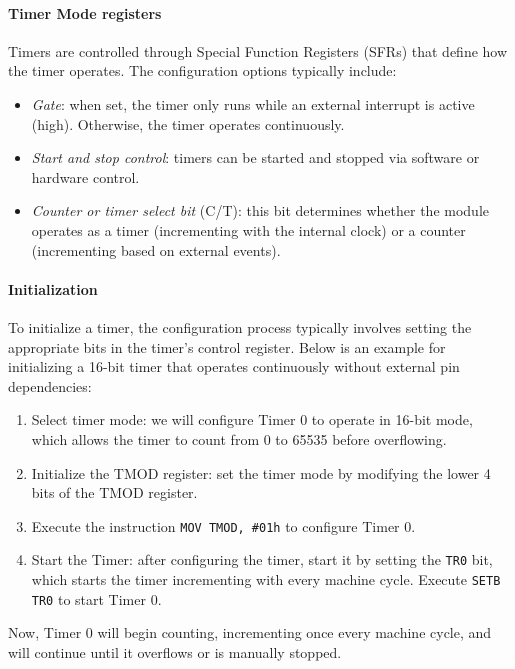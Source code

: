 \paragraph*{Timer Mode registers}
Timers are controlled through Special Function Registers (SFRs) that define how the timer operates. 
The configuration options typically include:
\begin{itemize}
    \item \textit{Gate}: when set, the timer only runs while an external interrupt is active (high). 
        Otherwise, the timer operates continuously.
    \item \textit{Start and stop control}: timers can be started and stopped via software or hardware control. 
    \item \textit{Counter or timer select bit} (C/T): this bit determines whether the module operates as a timer (incrementing with the internal clock) or a counter (incrementing based on external events). 
\end{itemize}

\paragraph*{Initialization}
To initialize a timer, the configuration process typically involves setting the appropriate bits in the timer's control register. 
Below is an example for initializing a 16-bit timer that operates continuously without external pin dependencies:
\begin{enumerate}
    \item Select timer mode: we will configure Timer 0 to operate in 16-bit mode, which allows the timer to count from 0 to 65535 before overflowing.
    \item Initialize the TMOD register: set the timer mode by modifying the lower 4 bits of the TMOD register. 
    \item Execute the instruction \texttt{MOV TMOD, \#01h} to configure Timer 0.
    \item Start the Timer: after configuring the timer, start it by setting the \texttt{TR0} bit, which starts the timer incrementing with every machine cycle.
        Execute \texttt{SETB TR0} to start Timer 0.
\end{enumerate}
Now, Timer 0 will begin counting, incrementing once every machine cycle, and will continue until it overflows or is manually stopped.

